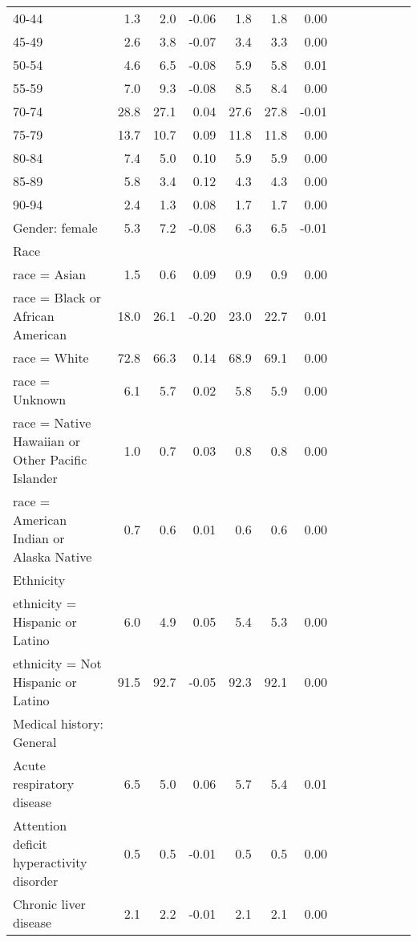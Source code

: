 \documentclass[11pt,]{article}
\begin{document}
\begin{longtable}{lrrrrrrrrrrrr}
      40-44 &  1.3 &  2.0 & -0.06 &  1.8 &  1.8 &  0.00 \\ 
      45-49 &  2.6 &  3.8 & -0.07 &  3.4 &  3.3 &  0.00 \\ 
      50-54 &  4.6 &  6.5 & -0.08 &  5.9 &  5.8 &  0.01 \\ 
      55-59 &  7.0 &  9.3 & -0.08 &  8.5 &  8.4 &  0.00 \\ 
      70-74 & 28.8 & 27.1 &  0.04 & 27.6 & 27.8 & -0.01 \\ 
      75-79 & 13.7 & 10.7 &  0.09 & 11.8 & 11.8 &  0.00 \\ 
      80-84 &  7.4 &  5.0 &  0.10 &  5.9 &  5.9 &  0.00 \\ 
      85-89 &  5.8 &  3.4 &  0.12 &  4.3 &  4.3 &  0.00 \\ 
      90-94 &  2.4 &  1.3 &  0.08 &  1.7 &  1.7 &  0.00 \\ 
  Gender: female &  5.3 &  7.2 & -0.08 &  6.3 &  6.5 & -0.01 \\ 
  Race &    &    &     &    &    &     \\ 
      race = Asian &  1.5 &  0.6 &  0.09 &  0.9 &  0.9 &  0.00 \\ 
      race = Black or African American & 18.0 & 26.1 & -0.20 & 23.0 & 22.7 &  0.01 \\ 
      race = White & 72.8 & 66.3 &  0.14 & 68.9 & 69.1 &  0.00 \\ 
      race = Unknown &  6.1 &  5.7 &  0.02 &  5.8 &  5.9 &  0.00 \\ 
      race = Native Hawaiian or Other Pacific Islander &  1.0 &  0.7 &  0.03 &  0.8 &  0.8 &  0.00 \\ 
      race = American Indian or Alaska Native &  0.7 &  0.6 &  0.01 &  0.6 &  0.6 &  0.00 \\ 
  Ethnicity &    &    &     &    &    &     \\ 
      ethnicity = Hispanic or Latino &  6.0 &  4.9 &  0.05 &  5.4 &  5.3 &  0.00 \\ 
      ethnicity = Not Hispanic or Latino & 91.5 & 92.7 & -0.05 & 92.3 & 92.1 &  0.00 \\ 
  Medical history: General &    &    &     &    &    &     \\ 
      Acute respiratory disease &  6.5 &  5.0 &  0.06 &  5.7 &  5.4 &  0.01 \\ 
      Attention deficit hyperactivity disorder &  0.5 &  0.5 & -0.01 &  0.5 &  0.5 &  0.00 \\ 
      Chronic liver disease &  2.1 &  2.2 & -0.01 &  2.1 &  2.1 &  0.00 \\ 

\end{longtable}
\end{document}
